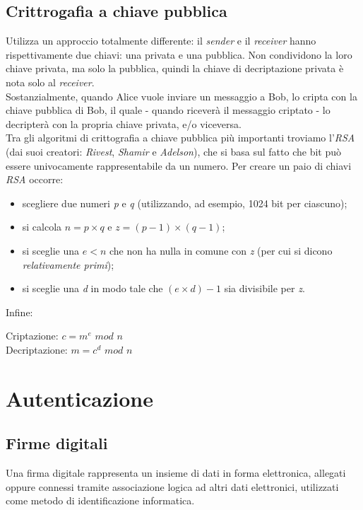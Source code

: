 \subsection{Crittrogafia a chiave pubblica}
Utilizza un approccio totalmente differente: il \textit{sender} e il \textit{receiver} hanno rispettivamente due chiavi: una privata e una pubblica. Non condividono la loro chiave privata, ma solo la pubblica, quindi la chiave di decriptazione privata è nota solo al \textit{receiver}. \\
Sostanzialmente, quando Alice vuole inviare un messaggio a Bob, lo cripta con la chiave pubblica di Bob, il quale - quando riceverà il messaggio criptato - lo decripterà con la propria chiave privata, e/o viceversa. \\
Tra gli algoritmi di crittografia a chiave pubblica più importanti troviamo l'\textit{RSA} (dai suoi creatori: \textit{Rivest}, \textit{Shamir} e \textit{Adelson}), che si basa sul fatto che bit può essere univocamente rappresentabile da un numero. Per creare un paio di chiavi \textit{RSA} occorre:
\begin{itemize}
	\item scegliere due numeri \textit{p} e \textit{q} (utilizzando, ad esempio, 1024 bit per ciascuno);
	\item si calcola $n=p\times q$ e $z=(p-1)\times (q-1)$;
	\item si sceglie una $e < n$ che non ha nulla in comune con \textit{z} (per cui si dicono \textit{relativamente primi});
	\item si sceglie una \textit{d} in modo tale che $(e\times d)-1$ sia divisibile per \textit{z}.
\end{itemize}
Infine:
\begin{center}
	Criptazione: $c = m^e$ $mod$ $n$ \\
	Decriptazione: $m = c^d$ $mod$ $n$
\end{center}

\section{Autenticazione}
\subsection{Firme digitali}
Una firma digitale rappresenta un insieme di dati in forma elettronica, allegati oppure connessi tramite associazione logica ad altri dati elettronici, utilizzati come metodo di identificazione informatica.

